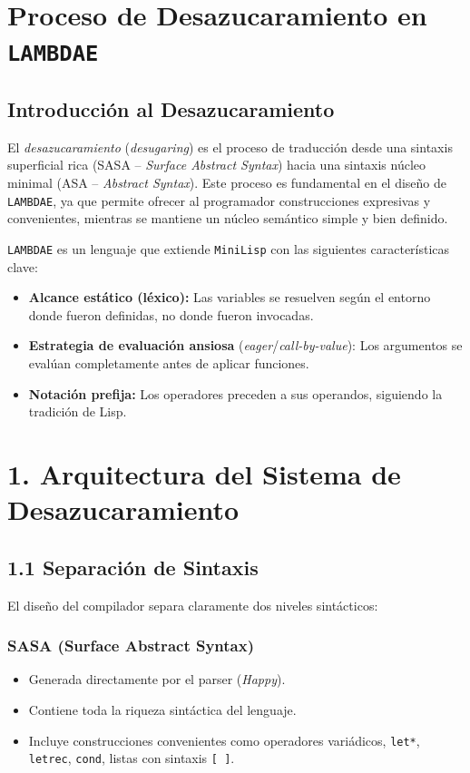 \documentclass[a4paper,12pt]{article}
\begin{document}
\begin{tcolorbox}[title= Corrección: Desugar modulo A4, breakable]

\section*{Proceso de Desazucaramiento en \texttt{LAMBDAE}}

\subsection*{Introducción al Desazucaramiento}

El \textit{desazucaramiento} (\textit{desugaring}) es el proceso de traducción desde una sintaxis superficial rica (SASA -- \textit{Surface Abstract Syntax}) hacia una sintaxis núcleo minimal (ASA -- \textit{Abstract Syntax}). Este proceso es fundamental en el diseño de \texttt{LAMBDAE}, ya que permite ofrecer al programador construcciones expresivas y convenientes, mientras se mantiene un núcleo semántico simple y bien definido.

\texttt{LAMBDAE} es un lenguaje que extiende \texttt{MiniLisp} con las siguientes características clave:

\begin{itemize}
    \item \textbf{Alcance estático (léxico):} Las variables se resuelven según el entorno donde fueron definidas, no donde fueron invocadas.
    \item \textbf{Estrategia de evaluación ansiosa} (\textit{eager}/\textit{call-by-value}): Los argumentos se evalúan completamente antes de aplicar funciones.
    \item \textbf{Notación prefija:} Los operadores preceden a sus operandos, siguiendo la tradición de Lisp.
\end{itemize}

\section*{1. Arquitectura del Sistema de Desazucaramiento}

\subsection*{1.1 Separación de Sintaxis}

El diseño del compilador separa claramente dos niveles sintácticos:

\subsubsection*{SASA (Surface Abstract Syntax)}
\begin{itemize}
    \item Generada directamente por el parser (\textit{Happy}).
    \item Contiene toda la riqueza sintáctica del lenguaje.
    \item Incluye construcciones convenientes como operadores variádicos, \texttt{let*}, \texttt{letrec}, \texttt{cond}, listas con sintaxis \texttt{[\,]}.
\end{itemize}


\end{tcolorbox}
\end{document}
